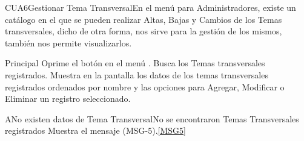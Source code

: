 
	\begin{UseCase}{CUA6}{Gestionar Tema Transversal}{En el menú para Administradores, existe un catálogo en el que se pueden realizar Altas, Bajas y Cambios de los Temas transversales, dicho de otra forma, nos sirve para la gestión de los mismos, también nos permite visualizarlos.}
	\end{UseCase}
	
	\begin{UCtrayectoria}{Principal}
		\UCpaso[\UCactor] Oprime el botón  en el menú .
		\UCpaso Busca los Temas transversales registrados. \label{paso:CUS2buscarTemasTransversales} 
		\UCpaso Muestra en la pantalla  los datos de los temas transversales registrados ordenados por nombre y las opciones para Agregar, Modificar o Eliminar un registro seleccionado.    
	\end{UCtrayectoria}

		\begin{UCtrayectoriaA}{A}{No existen datos de Tema Transversal}{No se encontraron Temas Transversales registrados}
			\UCpaso Muestra el mensaje (MSG-5).\ref{MSG5}			
	\end{UCtrayectoriaA}
	  	
